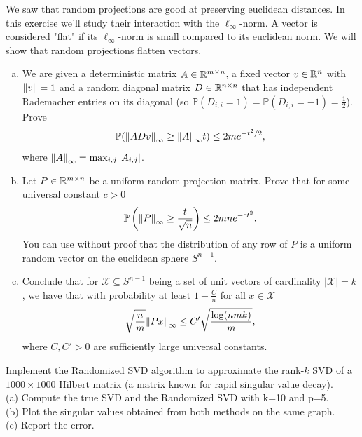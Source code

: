 \begin{myexercise}\label{prob:projections_flatten_vectors}
     We saw that random projections are good at preserving euclidean distances. In this exercise we'll study their interaction with the $\ell_\infty$-norm. A vector is considered "flat" if its $\ell_\infty$-norm is small compared to its euclidean norm. We will show that random projections flatten vectors. 
    \begin{enumerate}[(a)]
        \item We are given a deterministic matrix $A \in \mathbb{R}^{m \times n}$, a fixed vector $v \in \mathbb{R}^n$ with ${\left\lVert{v}\right\rVert} =1$ and a random diagonal matrix $D \in \mathbb{R}^{n \times n}$ that has independent Rademacher entries on its diagonal (so $\mathbb{P}(D_{i,i} = 1) = \mathbb{P}(D_{i,i} = -1) = \frac12$). Prove
        \begin{equation*}
            \mathbb{P}({\left\lVert{ADv}\right\rVert}_\infty \geq {\left\lVert{A}\right\rVert}_\infty t) \leq 2m e^{-t^2/2},
        \end{equation*}
        where ${\left\lVert{A}\right\rVert}_\infty = \max_{i,j} |A_{i,j}|$.
        \item Let $P \in \mathbb{R}^{m \times n}$ be a uniform random projection matrix. Prove that for some universal constant $c>0$
        $$\mathbb{P} \left( {\left\lVert{P}\right\rVert}_\infty \geq  \frac{t}{\sqrt{n}} \right) \leq 2mn e^{-ct^2}.$$
        You can use without proof that the distribution of any row of $P$ is a uniform random vector on the euclidean sphere $S^{n-1}$.
        \item Conclude that for $\mathcal{X} \subseteq S^{n-1}$ being a set of unit vectors of cardinality $|\mathcal{X}| = k$, we have that with probability at least $1- \frac Cn$ for all $x \in \mathcal{X}$
        $$ \sqrt{\frac nm }{\left\lVert{Px }\right\rVert}_\infty \leq C'\sqrt{\frac{\log(nmk)}{m}},$$
        where $C,C'>0$ are sufficiently large universal constants.
    \end{enumerate}
\end{myexercise}

\begin{myexercise}
Implement the Randomized SVD algorithm to approximate the rank-$k$ SVD of a $1000 \times 1000$ Hilbert matrix (a matrix known for rapid singular value decay).\\
(a) Compute the true SVD and the Randomized SVD with k=10 and p=5. \\
(b) Plot the singular values obtained from both methods on the same graph. \\
(c) Report the error.
\end{myexercise}


